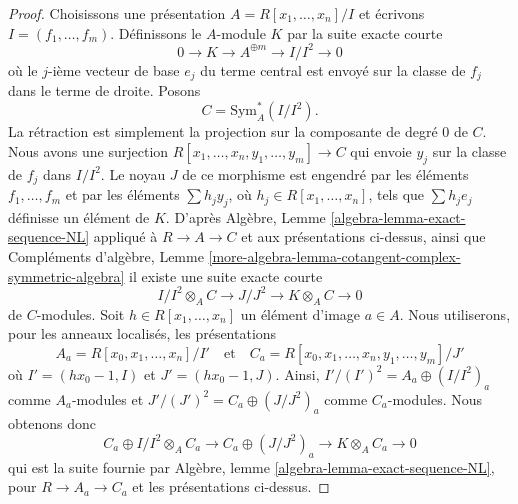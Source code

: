 \begin{proof}
Choisissons une présentation $A = R[x_1, \ldots, x_n]/I$ et écrivons
$I = (f_1, \ldots, f_m)$. Définissons le $A$-module $K$ par la suite exacte courte
$$
0 \to K \to A^{\oplus m} \to I/I^2 \to 0
$$
où le $j$-ième vecteur de base $e_j$ du terme central est envoyé sur la classe de
$f_j$ dans le terme de droite. Posons
$$
C = \text{Sym}^*_A(I/I^2).
$$
La rétraction est simplement la projection sur la composante de degré $0$ de
$C$. Nous avons une surjection
$R[x_1, \ldots, x_n, y_1, \ldots, y_m] \to C$ qui envoie $y_j$ sur la classe de
$f_j$ dans $I/I^2$. Le noyau $J$ de ce morphisme est engendré par les éléments
$f_1, \ldots, f_m$ et par les éléments $\sum h_j y_j$, où
$h_j \in R[x_1, \ldots, x_n]$, tels que $\sum h_j e_j$ définisse un élément de
$K$. D'après
Algèbre, Lemme \ref{algebra-lemma-exact-sequence-NL}
appliqué à $R \to A \to C$ et aux présentations ci-dessus, ainsi que
Compléments d'algèbre, Lemme
\ref{more-algebra-lemma-cotangent-complex-symmetric-algebra}
il existe une suite exacte courte
\begin{equation}
\label{equation-sequence}
I/I^2 \otimes_A C \to J/J^2 \to K \otimes_A C \to 0
\end{equation}
de $C$-modules. Soit $h \in R[x_1, \ldots, x_n]$ un élément d'image $a \in A$.
Nous utiliserons, pour les anneaux localisés, les présentations
$$
A_a = R[x_0, x_1, \ldots, x_n]/I'
\quad\text{et}\quad
C_a = R[x_0, x_1, \ldots, x_n, y_1, \ldots, y_m]/J'
$$
où $I' = (hx_0 - 1, I)$ et $J' = (hx_0 - 1, J)$. Ainsi,
$I'/(I')^2 = A_a \oplus (I/I^2)_a$ comme $A_a$-modules et
$J'/(J')^2 = C_a \oplus (J/J^2)_a$ comme $C_a$-modules.
Nous obtenons donc
\begin{equation}
\label{equation-sequence-localized}
C_a \oplus I/I^2 \otimes_A C_a \to
C_a \oplus (J/J^2)_a \to
K \otimes_A C_a \to 0
\end{equation}
qui est la suite fournie par
Algèbre, lemme \ref{algebra-lemma-exact-sequence-NL},
pour $R \to A_a \to C_a$ et les présentations ci-dessus.


\end{proof}
